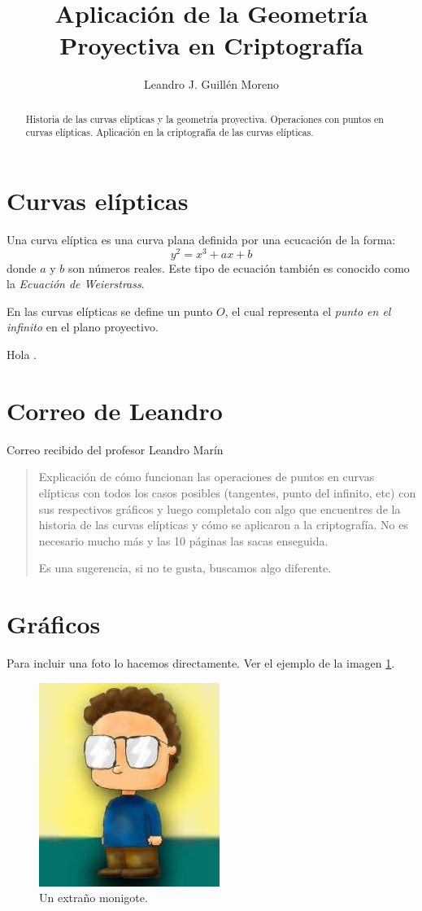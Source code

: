 \documentclass[a4,12pt]{article}
\title{Aplicación de la Geometría Proyectiva en Criptografía}
\author{Leandro J. Guillén Moreno}
\date{}
\begin{document}
\maketitle

\begin{abstract}
Historia de las curvas elípticas y la geometría proyectiva. Operaciones con puntos en curvas elípticas. Aplicación en la criptografía de las curvas elípticas.
\end{abstract}

\section{Curvas elípticas}


Una curva elíptica es una curva plana definida por una ecucación de la forma: $$y^{2}=x^{3}+ax+b$$ donde $a$ y $b$ son números reales. Este tipo de ecuación también es conocido como la \emph{Ecuación de Weierstrass}.

En las curvas elípticas se define un punto $O$, el cual representa el \emph{punto en el infinito} en el plano proyectivo.

Hola \cite{lamport94}.


\section{Correo de Leandro}
Correo recibido del profesor Leandro Marín

\begin{quotation}
Explicación de cómo funcionan las operaciones de puntos en curvas elípticas con todos los casos posibles (tangentes, punto del infinito, etc) con sus respectivos gráficos y luego completalo con algo que encuentres de la historia de las curvas elípticas y cómo se aplicaron a la criptografía. No es necesario mucho más y las 10 páginas las sacas enseguida.

Es una sugerencia, si no te gusta, buscamos algo diferente.
\end{quotation}
\section{Gráficos}

Para incluir una foto lo hacemos directamente. Ver el ejemplo de la imagen \ref{fig:monigote}.

\begin{figure}[h]
\begin{center}
\includegraphics[width=0.2\linewidth]{imagenes/comic}
\end{center}
\caption{Un extraño monigote.}
\label{fig:monigote}
\end{figure}
\end{document}
